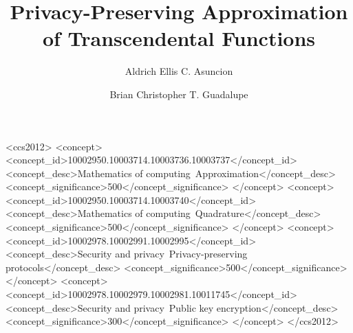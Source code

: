 \documentclass[sigconf,balance]{acmart}
\begin{document}
\title{Privacy-Preserving Approximation of Transcendental Functions}

\author{Aldrich Ellis C. Asuncion}

\author{Brian Christopher T. Guadalupe}


\begin{abstract}

\end{abstract}

%
%
\begin{CCSXML}
    <ccs2012>
    <concept>
    <concept_id>10002950.10003714.10003736.10003737</concept_id>
    <concept_desc>Mathematics of computing~Approximation</concept_desc>
    <concept_significance>500</concept_significance>
    </concept>
    <concept>
    <concept_id>10002950.10003714.10003740</concept_id>
    <concept_desc>Mathematics of computing~Quadrature</concept_desc>
    <concept_significance>500</concept_significance>
    </concept>
    <concept>
    <concept_id>10002978.10002991.10002995</concept_id>
    <concept_desc>Security and privacy~Privacy-preserving protocols</concept_desc>
    <concept_significance>500</concept_significance>
    </concept>
    <concept>
    <concept_id>10002978.10002979.10002981.10011745</concept_id>
    <concept_desc>Security and privacy~Public key encryption</concept_desc>
    <concept_significance>300</concept_significance>
    </concept>
    </ccs2012>
\end{CCSXML}
\end{document}
